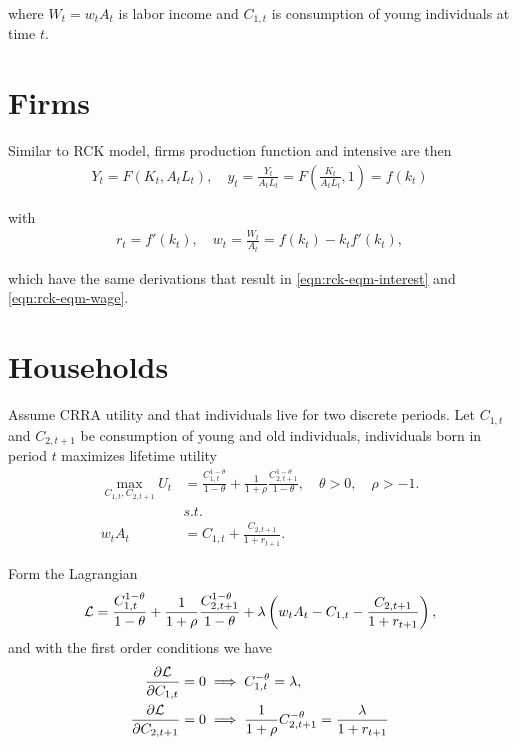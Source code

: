 \documentclass[../main.tex]{subfiles}
\begin{document}
        where $W_t = w_t A_t$ is labor income and $C_{1,t}$ is consumption of young individuals at time $t$.
    
    
    \section{Firms}
    
        Similar to RCK model, firms production function and intensive are then
        \begin{align}    
            Y_t = F(K_t, A_t L_t),
            \quad
            y_t = \frac{Y_t}{A_t L_t}
            = F\left(\frac{K_t}{A_t L_t}, 1\right)
            = f(k_t) 
        \end{align}
        
        with
        \begin{align}
            r_t = f'(k_t),
            \quad
            w_t = \frac{W_t}{A_t}
            = f(k_t) - k_t f'(k_t),
        \end{align}
        
        which have the same derivations that result in \eqref{eqn:rck-eqm-interest} and \eqref{eqn:rck-eqm-wage}.
        
    
    \section{Households}
        
        Assume CRRA utility and that individuals live for two discrete periods. Let $C_{1, t}$ and $C_{2, t+1}$ be consumption of young and old individuals, individuals born in period $t$ maximizes lifetime utility
        \begin{align}
            \max_{C_{1, t}, C_{2, t+1}} U_t
            &= \frac{C_{1, t}^{1-\theta}}{1-\theta}
            + \frac{1}{1+\rho}
            \frac{C_{2, t+1}^{1-\theta}}{1-\theta},
            \quad \theta > 0,
            \quad \rho > -1.
            \label{eqn:diamond-pv}
            \\
            & s.t. \nonumber
            \\
            w_t A_t
            &= C_{1, t} + \frac{C_{2, t+1}}{1 + r_{t+1}}.
            \label{eqn:diamond-bc}
        \end{align}
        
        Form the Lagrangian
        \begin{align}
            \mathcal{L}
            = \frac{C_{1, t}^{1-\theta}}{1-\theta}
            + \frac{1}{1+\rho}
            \frac{C_{2, t+1}^{1-\theta}}{1-\theta}
            + 
            \lambda \left(
            w_t A_t
            - C_{1, t} - \frac{C_{2, t+1}}{1 + r_{t+1}}
            \right),
        \end{align}
        and with the first order conditions we have
        \begin{align}
            \frac{\partial \mathcal{L}}{\partial C_{1,t}} = 0
            &\implies
            C_{1, t}^{-\theta} = \lambda,
            \\
            \frac{\partial \mathcal{L}}{\partial C_{2,t+1}} = 0
            &\implies
            \frac{1}{1+\rho}C_{2, t+1}^{-\theta} = \frac{\lambda}{1+r_{t+1}}
        \end{align}
        
\end{document}
